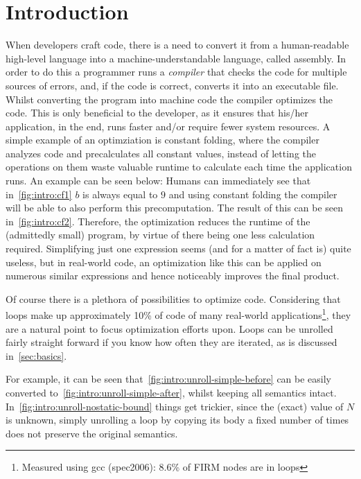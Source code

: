 \chapter{Introduction}\label{sec:intro}



When developers craft code, there is a need to convert it from a human-readable high-level language into a machine-understandable language, called assembly.
In order to do this a programmer runs a \textit{compiler} that checks the code for multiple sources of errors, and, if the code is correct, converts it into an executable file.
Whilst converting the program into machine code the compiler optimizes the code.
This is only beneficial to the developer, as it ensures that his/her application, in the end, runs faster and/or require fewer system resources.
A simple example of an optimziation is constant folding, where the compiler analyzes code and precalculates all constant values, instead of letting the operations on them waste valuable runtime to calculate each time the application runs.
An example can be seen below:
Humans can immediately see that in~\cref{fig:intro:cf1} $b$ is always equal to $9$ and using constant folding the compiler will be able to also perform this precomputation.
The result of this can be seen in~\cref{fig:intro:cf2}.
Therefore, the optimization reduces the runtime of the (admittedly small) program, by virtue of there being one less calculation required.
Simplifying just one expression seems (and for a matter of fact is) quite useless, but in real-world code, an optimization like this can be applied on numerous similar expressions and hence noticeably improves the final product.



Of course there is a plethora of possibilities to optimize code.
Considering that loops make up approximately 10\% of code of many real-world applications\footnote{Measured using gcc (spec2006): 8.6\% of FIRM nodes are in loops}, they are a natural point to focus optimization efforts upon.
Loops can be unrolled fairly straight forward if you know how often they are iterated, as is discussed in~\cref{sec:basics}.

For example, it can be seen that~\cref{fig:intro:unroll-simple-before} can be easily converted to~\cref{fig:intro:unroll-simple-after}, whilst keeping all semantics intact.
In~\cref{fig:intro:unroll-nostatic-bound} things get trickier, since the (exact) value of $N$ is unknown, simply unrolling a loop by copying its body a fixed number of times does not preserve the original semantics.

